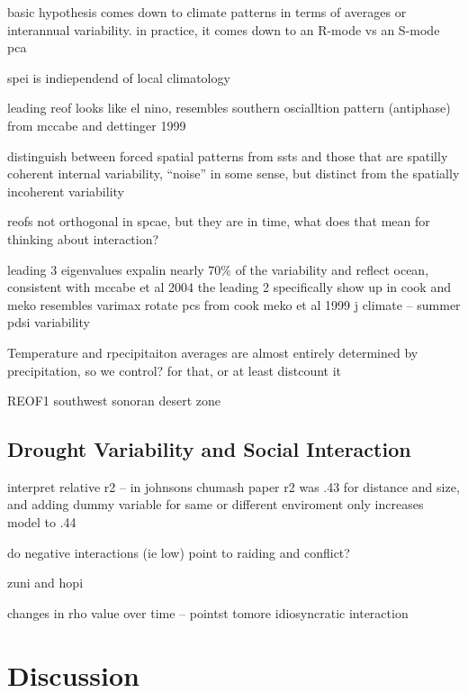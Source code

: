 \documentclass[10pt,letterpaper]{article}
\begin{document}
basic hypothesis comes down to climate patterns in terms of averages or
interannual variability. in practice, it comes down to an R-mode vs an
S-mode pca

spei is indiependend of local climatology

leading reof looks like el nino, resembles southern oscialltion pattern
(antiphase) from mccabe and dettinger 1999

distinguish between forced spatial patterns from ssts and those that are
spatilly coherent internal variability, ``noise'' in some sense, but
distinct from the spatially incoherent variability

reofs not orthogonal in spcae, but they are in time, what does that mean
for thinking about interaction?

leading 3 eigenvalues expalin nearly 70\% of the variability and reflect
ocean, consistent with mccabe et al 2004 the leading 2 specifically show
up in cook and meko resembles varimax rotate pcs from cook meko et al
1999 j climate -- summer pdsi variability

Temperature and rpecipitaiton averages are almost entirely determined by
precipitation, so we control? for that, or at least distcount it

REOF1 southwest sonoran desert zone

\subsection{Drought Variability and Social
Interaction}\label{drought-variability-and-social-interaction}

interpret relative r2 -- in johnsons chumash paper r2 was .43 for
distance and size, and adding dummy variable for same or different
enviroment only increases model to .44

do negative interactions (ie low) point to raiding and conflict?

zuni and hopi

changes in rho value over time -- pointst tomore idiosyncratic
interaction

\section{Discussion}\label{discussion}
\end{document}

